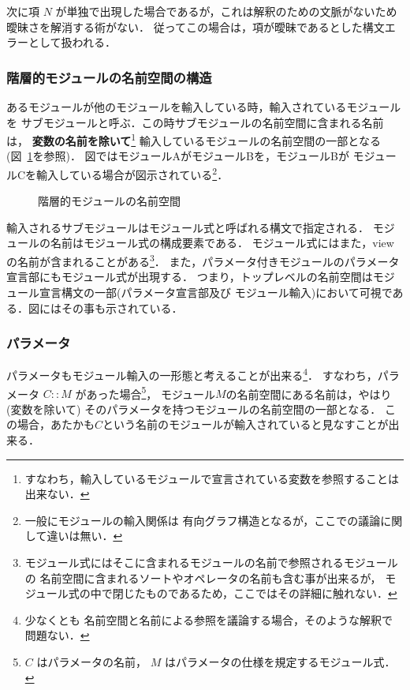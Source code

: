 \documentclass[a4paper,oneside,10pt]{memoir}
\begin{document}
次に項 $N$ が単独で出現した場合であるが，これは解釈のための文脈がないため%
曖昧さを解消する術がない．
従ってこの場合は，項が曖昧であるとした構文エラーとして扱われる．

\subsubsection{階層的モジュールの名前空間の構造}
\label{sec:hierachical-module}
あるモジュールが他のモジュールを輸入している時，輸入されているモジュールを%
サブモジュールと呼ぶ．この時サブモジュールの名前空間に含まれる名前は，
\textbf{変数の名前を除いて}\footnote{
すなわち，輸入しているモジュールで宣言されている変数を参照することは出来ない．}
輸入しているモジュールの名前空間の一部となる(図~\ref{fig:hir-module}を参照)．
図ではモジュールAがモジュールBを，モジュールBが%
モジュールCを輸入している場合が図示されている\footnote{一般にモジュールの輸入関係は%
有向グラフ構造となるが，ここでの議論に関して違いは無い．}．
\begin{figure}[!ht]
\begin{center}
  
  \caption{階層的モジュールの名前空間}
  \label{fig:hir-module}
\end{center}
\end{figure}

輸入されるサブモジュールはモジュール式と呼ばれる構文で指定される．
モジュールの名前はモジュール式の構成要素である．
モジュール式にはまた，viewの名前が含まれることがある\footnote{
モジュール式にはそこに含まれるモジュールの名前で参照されるモジュールの%
名前空間に含まれるソートやオペレータの名前も含む事が出来るが，
モジュール式の中で閉じたものであるため，ここではその詳細に触れない．}．
また，パラメータ付きモジュールのパラメータ宣言部にもモジュール式が出現する．
つまり，トップレベルの名前空間はモジュール宣言構文の一部(パラメータ宣言部及び%
モジュール輸入)において可視である．図にはその事も示されている．

\subsubsection{パラメータ}
パラメータもモジュール輸入の一形態と考えることが出来る\footnote{少なくとも%
名前空間と名前による参照を議論する場合，そのような解釈で問題ない．}．
すなわち，パラメータ $C :: M$ があった場合\footnote{$C$ はパラメータの名前，
$M$ はパラメータの仕様を規定するモジュール式．}，
モジュール$M$の名前空間にある名前は，やはり(変数を除いて)%
そのパラメータを持つモジュールの名前空間の一部となる．
この場合，あたかも$C$という名前のモジュールが輸入されていると見なすことが出来る．
\end{document}

